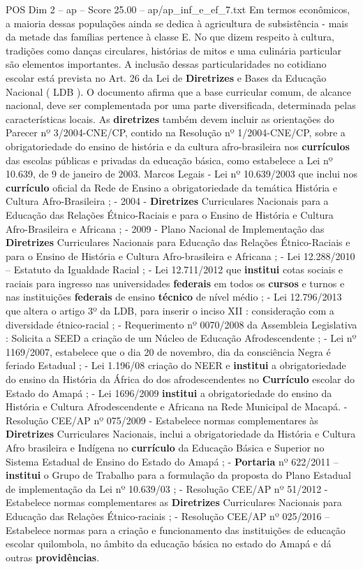 \begin{textsample}{POS Dim 2 – ap – Score 25.00 – ap/ap\_inf\_e\_ef\_7.txt}
Em termos econômicos, a maioria dessas populações ainda se dedica à agricultura de subsistência - mais da metade das famílias pertence à classe E.
No que dizem respeito à cultura, tradições como danças circulares, histórias de mitos e uma culinária particular são elementos importantes.
A inclusão dessas particularidades no cotidiano escolar está prevista no Art. 26 da Lei de \textbf{Diretrizes} e Bases da Educação Nacional ( LDB ).
O documento afirma que a base curricular comum, de alcance nacional, deve ser complementada por uma parte diversificada, determinada pelas características locais.
As \textbf{diretrizes} também devem incluir as orientações do Parecer nº 3/2004-CNE/CP, contido na Resolução nº 1/2004-CNE/CP, sobre a obrigatoriedade do ensino de história e da cultura afro-brasileira nos \textbf{currículos} das escolas públicas e privadas da educação básica, como estabelece a Lei nº 10.639, de 9 de janeiro de 2003.
Marcos Legais - Lei nº 10.639/2003 que inclui nos \textbf{currículo} oficial da Rede de Ensino a obrigatoriedade da temática História e Cultura Afro-Brasileira ; - 2004 - \textbf{Diretrizes} Curriculares Nacionais para a Educação das Relações Étnico-Raciais e para o Ensino de História e Cultura Afro-Brasileira e Africana ; - 2009 - Plano Nacional de Implementação das \textbf{Diretrizes} Curriculares Nacionais para Educação das Relações Étnico-Raciais e para o Ensino de História e Cultura Afro-brasileira e Africana ; - Lei 12.288/2010 – Estatuto da Igualdade Racial ; - Lei 12.711/2012 que \textbf{institui} cotas sociais e raciais para ingresso nas universidades \textbf{federais} em todos os \textbf{cursos} e turnos e nas instituições \textbf{federais} de ensino \textbf{técnico} de nível médio ; - Lei 12.796/2013 que altera o artigo 3º da LDB, para inserir o inciso XII : consideração com a diversidade étnico-racial ; - Requerimento nº 0070/2008 da Assembleia Legislativa : Solicita a SEED a criação de um Núcleo de Educação Afrodescendente ; - Lei nº 1169/2007, estabelece que o dia 20 de novembro, dia da consciência Negra é feriado Estadual ; - Lei 1.196/08 criação do NEER e \textbf{institui} a obrigatoriedade do ensino da História da África do dos afrodescendentes no \textbf{Currículo} escolar do Estado do Amapá ; - Lei 1696/2009 \textbf{institui} a obrigatoriedade do ensino da História e Cultura Afrodescendente e Africana na Rede Municipal de Macapá. - Resolução CEE/AP nº 075/2009 - Estabelece normas complementares às \textbf{Diretrizes} Curriculares Nacionais, inclui a obrigatoriedade da História e Cultura Afro brasileira e Indígena no \textbf{currículo} da Educação Básica e Superior no Sistema Estadual de Ensino do Estado do Amapá ; - \textbf{Portaria} nº 622/2011 – \textbf{institui} o Grupo de Trabalho para a formulação da proposta do Plano Estadual de implementação da Lei nº 10.639/03 ; - Resolução CEE/AP nº 51/2012 - Estabelece normas complementares as \textbf{Diretrizes} Curriculares Nacionais para Educação das Relações Étnico-raciais ; - Resolução CEE/AP nº 025/2016 – Estabelece normas para a criação e funcionamento das instituições de educação escolar quilombola, no âmbito da educação básica no estado do Amapá e dá outras \textbf{providências}.

\end{textsample}
